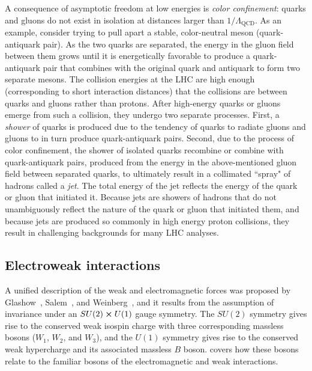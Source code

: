 A consequence of asymptotic freedom at low energies is \textit{color
confinement}: quarks and gluons do not exist in isolation at distances larger
than $1/\Lambda_\text{QCD}$. As an example, consider trying to pull apart a
stable, color-neutral meson (quark-antiquark pair). As the two quarks are
separated, the energy in the gluon field between them grows until it is
energetically favorable to produce a quark-antiquark pair that combines with the
original quark and antiquark to form two separate mesons. The collision energies
at the LHC are high enough (corresponding to short interaction distances) that
the collisions are between quarks and gluons rather than protons. After
high-energy quarks or gluons emerge from such a collision, they undergo two
separate processes. First, a \textit{shower} of quarks is produced due to the
tendency of quarks to radiate gluons and gluons to in turn produce
quark-antiquark pairs. Second, due to the process of color confinement, the
shower of isolated quarks recombine or combine with quark-antiquark pairs,
produced from the energy in the above-mentioned gluon field between separated
quarks, to ultimately result in a collimated ``spray" of hadrons called a
\textit{jet}. The total energy of the jet reflects the energy of the quark or
gluon that initiated it. Because jets are showers of hadrons that do not
unambiguously reflect the nature of the quark or gluon that initiated them, and
because jets are produced so commonly in high energy proton collisions, they
result in challenging backgrounds for many LHC analyses.

\subsection{Electroweak interactions}
\label{sec:electroweak}
A unified description of the weak and electromagnetic forces was proposed by
Glashow~\cite{GLASHOW1961579}, Salem~\cite{Salam:1968rm}, and
Weinberg~\cite{PhysRevLett.19.1264}, and it results from the assumption of
invariance under an $SU(2) \cross U(1)$ gauge symmetry.  The $SU(2)$ symmetry
gives rise to the conserved weak isospin charge with three corresponding
massless bosons ($W_1$, $W_2$, and $W_3$), and the $U(1)$ symmetry gives rise to
the conserved weak hypercharge and its associated massless $B$ boson.
 covers how these bosons relate to the familiar bosons of the
electromagnetic and weak interactions.

